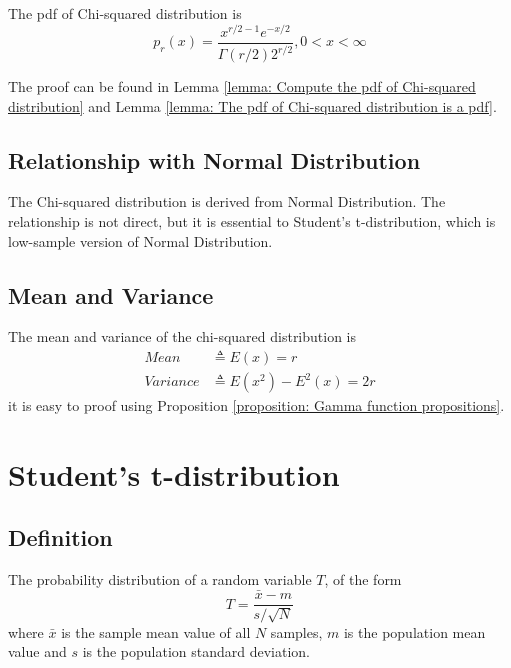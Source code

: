 \documentclass[a4paper]{article}
\begin{document}
The pdf of Chi-squared distribution is
\begin{equation}
    p_r(x) = \frac{x^{r/2-1} e^{-x/2}}{\Gamma(r/2) 2^{r/2}}, 0 < x < \infty
\end{equation}

The proof can be found in Lemma \ref{lemma: Compute the pdf of Chi-squared distribution} and Lemma \ref{lemma: The pdf of Chi-squared distribution is a pdf}.

\subsection{Relationship with Normal Distribution}

The Chi-squared distribution is derived from Normal Distribution.
The relationship is not direct, but it is essential to Student's t-distribution, which is low-sample version of Normal Distribution.

\subsection{Mean and Variance}

The mean and variance of the chi-squared distribution is
\begin{equation*}
    \begin{align}
        Mean     & \triangleq E(x) = r             \\
        Variance & \triangleq E(x^2) - E^2(x) = 2r
    \end{align}
\end{equation*}
it is easy to proof using Proposition \ref{proposition: Gamma function propositions}.

\newpage

\section{Student's t-distribution}

\subsection{Definition}

The probability distribution of a random variable $T$, of the form
\begin{equation*}
    T = \frac{\bar{x} - m}{s / \sqrt{N}}
\end{equation*}
where $\bar{x}$ is the sample mean value of all $N$ samples, $m$ is the population mean value and $s$ is the population standard deviation.
\end{document}
